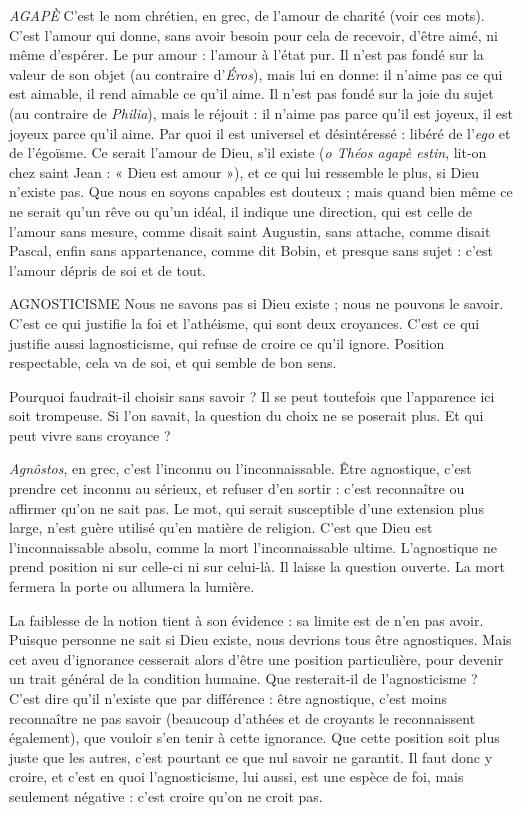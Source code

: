 {\it AGAPÈ} C’est le nom chrétien, en grec, de l'amour de charité (voir ces mots).
C’est l'amour qui donne, sans avoir besoin pour cela de recevoir,
d’être aimé, ni même d’espérer. Le pur amour : l’amour à l’état pur. Il n’est pas
fondé sur la valeur de son objet (au contraire d’{\it Éros}), mais lui en donne: il
n’aime pas ce qui est aimable, il rend aimable ce qu’il aime. Il n’est pas fondé
sur la joie du sujet (au contraire de {\it Philia}), mais le réjouit : il n'aime pas parce
qu'il est joyeux, il est joyeux parce qu’il aime. Par quoi il est universel et
désintéressé : libéré de l'{\it ego} et de l’égoïsme. Ce serait l'amour de Dieu, s'il
existe ({\it o Théos agapè estin}, lit-on chez saint Jean : « Dieu est amour »), et ce qui
lui ressemble le plus, si Dieu n’existe pas. Que nous en soyons capables est
douteux ; mais quand bien même ce ne serait qu’un rêve ou qu’un idéal, il
indique une direction, qui est celle de l'amour sans mesure, comme disait saint
Augustin, sans attache, comme disait Pascal, enfin sans appartenance, comme
dit Bobin, et presque sans sujet : c’est l'amour dépris de soi et de tout.

AGNOSTICISME Nous ne savons pas si Dieu existe ; nous ne pouvons le
savoir. C’est ce qui justifie la foi et l’athéisme, qui sont
deux croyances. C’est ce qui justifie aussi lagnosticisme, qui refuse de croire ce
qu’il ignore. Position respectable, cela va de soi, et qui semble de bon sens.

Pourquoi faudrait-il choisir sans savoir ? Il se peut toutefois que l’apparence ici
soit trompeuse. Si l’on savait, la question du choix ne se poserait plus. Et qui
peut vivre sans croyance ?

{\it Agnôstos}, en grec, c’est l'inconnu ou l’inconnaissable. Être agnostique, c’est
prendre cet inconnu au sérieux, et refuser d’en sortir : c’est reconnaître ou
affirmer qu’on ne sait pas. Le mot, qui serait susceptible d’une extension plus
large, n’est guère utilisé qu’en matière de religion. C’est que Dieu est l’inconnaissable
absolu, comme la mort l’inconnaissable ultime. L’agnostique ne
prend position ni sur celle-ci ni sur celui-là. Il laisse la question ouverte. La
mort fermera la porte ou allumera la lumière.

La faiblesse de la notion tient à son évidence : sa limite est de n’en pas
avoir. Puisque personne ne sait si Dieu existe, nous devrions tous être agnostiques.
Mais cet aveu d’ignorance cesserait alors d’être une position particulière,
pour devenir un trait général de la condition humaine. Que resterait-il de
l’agnosticisme ? C’est dire qu’il n’existe que par différence : être agnostique,
c'est moins reconnaître ne pas savoir (beaucoup d’athées et de croyants le
reconnaissent également), que vouloir s’en tenir à cette ignorance. Que cette
position soit plus juste que les autres, c’est pourtant ce que nul savoir ne
garantit. Il faut donc y croire, et c’est en quoi l’agnosticisme, lui aussi, est une
espèce de foi, mais seulement négative : c’est croire qu’on ne croit pas.

